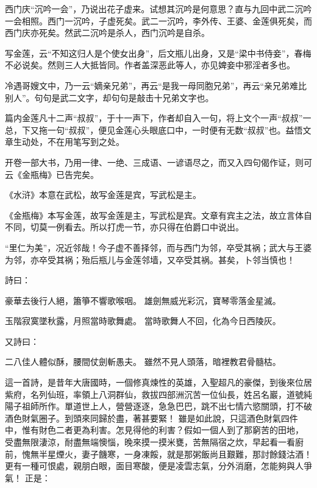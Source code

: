 \begin{showcontents}{}
{西门庆“沉吟一会”，乃说出花子虚来。试想其沉吟是何意思？直与九回中武二沉吟一会相照。西门一沉吟，子虚死矣。武二一沉吟，李外传、王婆、金莲俱死矣，而西门庆亦死矣。然武二沉吟是杀人，西门沉吟是自杀。

写金莲，云“不知这归人是个使女出身”，后文瓶儿出身，又是“梁中书侍妾”，春梅不必说矣。然则三人大抵皆同。作者盖深恶此等人，亦见婢妾中邪淫者多也。

冷遇哥嫂文中，乃一云“嫡亲兄弟”，再云“是我一母同胞兄弟”，再云“亲兄弟难比别人”。句句是武二文字，却句句是敲击十兄弟文字也。

篇内金莲凡十二声“叔叔”，于十一声下，作者却自入一句，将上文个一声“叔叔”一总，下又拖一句“叔叔”，便见金莲心头眼底口中，一时便有无数“叔叔”也。益悟文章生动处，不在用笔写到之处。

开卷一部大书，乃用一律、一绝、三成语、一谚语尽之，而又入四句偈作证，则可云《金瓶梅》已告完矣。

《水浒》本意在武松，故写金莲是宾，写武松是主。

《金瓶梅》本写金莲，故写金莲是主，写武松是宾。文章有宾主之法，故立言体自不同，切莫一例看去。所以打虎一节，亦只得在伯爵口中说出。

“里仁为美”，况近邻哉！今子虚不善择邻，而与西门为邻，卒受其祸；武大与王婆为邻，亦卒受其祸；殆后瓶儿与金莲邻墙，又卒受其祸。甚矣，卜邻当慎也！

} %

詩曰：

豪華去後行人絕，簫箏不響歌喉咽。
雄劍無威光彩沉，寶琴零落金星滅。

玉階寂寞墜秋露，月照當時歌舞處。
當時歌舞人不回，化為今日西陵灰。

又詩曰：

二八佳人體似酥，腰間仗劍斬愚夫。
雖然不見人頭落，暗裡教君骨髓枯。

這一首詩，是昔年大唐國時，一個修真煉性的英雄，入聖超凡的豪傑，到後來位居紫府，名列仙班，率領上八洞群仙，救拔四部洲沉苦一位仙長，姓呂名巖，道號純陽子祖師所作。單道世上人，營營逐逐，急急巴巴，跳不出七情六慾關頭，打不破酒色財氣圈子。到頭來同歸於盡，著甚要緊！
雖是如此說，只這酒色財氣四件中，惟有財色二者更為利害。怎見得他的利害？假如一個人到了那窮苦的田地，
受盡無限淒涼，耐盡無端懊惱，晚來摸一摸米甕，苦無隔宿之炊，早起看一看廚前，愧無半星煙火，妻子饑寒，一身凍餒，就是那粥飯尚且艱難，那討餘錢沽酒！
更有一種可恨處，親朋白眼，面目寒酸，便是凌雲志氣，分外消磨，怎能夠與人爭氣！
正是：


\end{showcontents}
